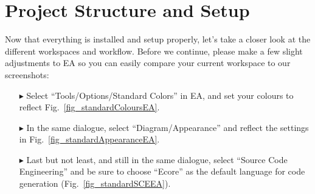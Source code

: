 \section{Project Structure and Setup}
Now that everything is installed and setup properly, let's take a closer look at
the different workspaces and workflow.  Before we continue, please make
a few slight adjustments to EA so you can easily compare your current workspace 
to our screenshots:
\begin{itemize}
  \item[$\blacktriangleright$] Select ``Tools/Options/Standard Colors'' in EA,
  and set your colours to reflect Fig.~\ref{fig_standardColoursEA}.
  \item[$\blacktriangleright$] In the same dialogue, select
  ``Diagram/Appearance'' and reflect the settings in
  Fig.~\ref{fig_standardAppearanceEA}.
  \item[$\blacktriangleright$] Last but not least, and still in the same
  dialogue, select ``Source Code Engineering'' and be sure to choose ``Ecore''
  as the default language for code generation (Fig.~\ref{fig_standardSCEEA}).
\end{itemize}
\newpage
